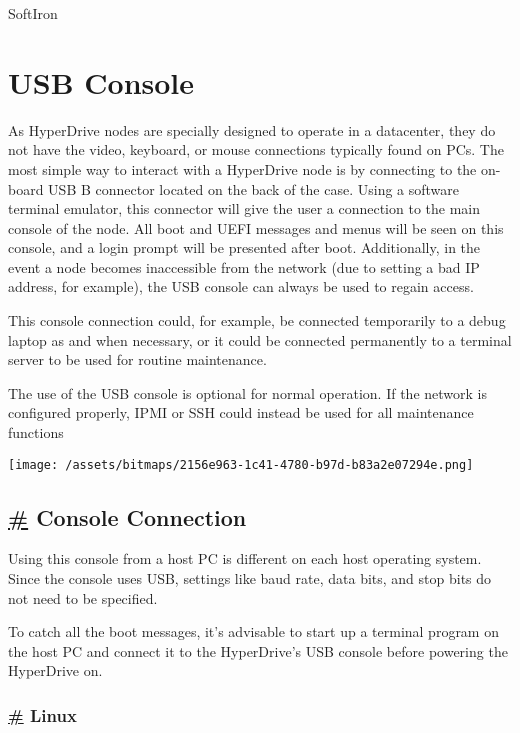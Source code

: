 {SoftIron}

\hypertarget{usb-console}{%
\section{USB Console}\label{usb-console}}

As HyperDrive nodes are specially designed to operate in a datacenter,
they do not have the video, keyboard, or mouse connections typically
found on PCs. The most simple way to interact with a HyperDrive node is
by connecting to the on-board USB B connector located on the back of the
case. Using a software terminal emulator, this connector will give the
user a connection to the main console of the node. All boot and UEFI
messages and menus will be seen on this console, and a login prompt will
be presented after boot. Additionally, in the event a node becomes
inaccessible from the network (due to setting a bad IP address, for
example), the USB console can always be used to regain access.

This console connection could, for example, be connected temporarily to
a debug laptop as and when necessary, or it could be connected
permanently to a terminal server to be used for routine maintenance.

The use of the USB console is optional for normal operation. If the
network is configured properly, IPMI or SSH could instead be used for
all maintenance functions

\texttt{[image: /assets/bitmaps/2156e963-1c41-4780-b97d-b83a2e07294e.png]}

\hypertarget{console-connection}{%
\subsection{\texorpdfstring{\protect\hyperlink{console-connection}{\#}
Console Connection}{\# Console Connection}}\label{console-connection}}

Using this console from a host PC is different on each host operating
system. Since the console uses USB, settings like baud rate, data bits,
and stop bits do not need to be specified.

To catch all the boot messages, it's advisable to start up a terminal
program on the host PC and connect it to the HyperDrive's USB console
before powering the HyperDrive on.

\hypertarget{linux}{%
\subsubsection{\texorpdfstring{\protect\hyperlink{linux}{\#}
Linux}{\# Linux}}\label{linux}}

